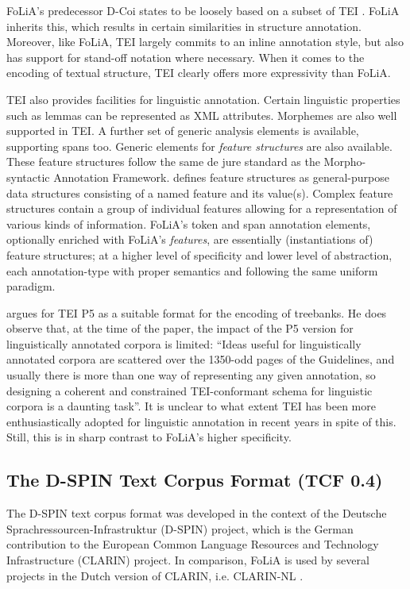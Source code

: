\documentclass[a4paper,10pt,twoside]{article}
\begin{document}
FoLiA's predecessor D-Coi states to be loosely based on a subset of TEI
\cite{DCOI}. FoLiA inherits this, which results in certain similarities in
structure annotation. Moreover, like FoLiA, TEI largely commits to an inline
annotation style, but also has support for stand-off notation where necessary.
When it comes to the encoding of textual structure, TEI clearly offers more
expressivity than FoLiA. 

TEI also provides facilities for linguistic annotation. Certain linguistic
properties such as lemmas can be represented as XML attributes.  Morphemes are
also well supported in TEI. A further set of generic analysis elements is
available, supporting spans too. Generic elements for \emph{feature structures}
are also available. These feature structures follow the same de jure standard
as the Morpho-syntactic Annotation Framework.  defines
feature structures as general-purpose data structures consisting of a named
feature and its value(s). Complex feature structures contain a group of
individual features allowing for a representation of various kinds of
information. FoLiA's token and span annotation elements, optionally enriched
with FoLiA's \emph{features}, are essentially (instantiations of) feature
structures; at a higher level of specificity and lower level of abstraction,
each annotation-type with proper semantics and following the same uniform
paradigm.

 argues for TEI P5 as a suitable format for the encoding of
treebanks. He does observe that, at the time of the paper, the impact of the P5
version for linguistically annotated corpora is limited: ``Ideas useful for
linguistically annotated corpora are scattered over the 1350-odd pages of the
Guidelines, and usually there is more than one way of representing any given
annotation, so designing a coherent and constrained TEI-conformant schema for
linguistic corpora is a daunting task''.  It is unclear to what extent TEI has
been more enthusiastically adopted for linguistic annotation in recent years
in spite of this. Still, this is in sharp contrast to FoLiA's higher specificity.


\subsection{The D-SPIN Text Corpus Format (TCF 0.4)}

The D-SPIN text corpus format \cite{TCF} was developed in the context of the
Deutsche Sprachressourcen-Infrastruktur (D-SPIN) project, which is the
German contribution to the European Common Language Resources and Technology
Infrastructure (CLARIN) project. In comparison, FoLiA is used by several
projects in the Dutch version of CLARIN, i.e. CLARIN-NL  \cite{CLARINNL}.
\end{document}
